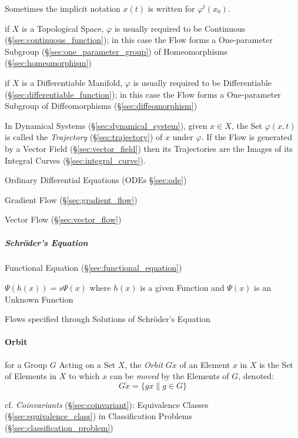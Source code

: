 Sometimes the implicit notation $x(t)$ is written for $\varphi^t(x_0)$.

if $X$ is a Topological Space, $\varphi$ is usually required to be Continuous
(\S\ref{sec:continuous_function}); in this case the Flow forms a One-parameter
Subgroup (\S\ref{sec:one_parameter_group}) of Homeomorphisms
(\S\ref{sec:homeomorphism})

if $X$ is a Differentiable Manifold, $\varphi$ is usually required to be
Differentiable (\S\ref{sec:differentiable_function}); in this case the Flow
forms a One-parameter Subgroup of Diffeomorphisms (\S\ref{sec:diffeomorphism})

In Dynamical Systems (\S\ref{sec:dynamical_system}), given $x \in X$, the Set
$\varphi(x,t)$ is called the \emph{Trajectory} (\S\ref{sec:trajectory}) of $x$
under $\varphi$. If the Flow is generated by a Vector Field
(\S\ref{sec:vector_field}) then its Trajectories are the Images of its Integral
Curves (\S\ref{sec:integral_curve}).

\fist Ordinary Differential Equations (ODEs \S\ref{sec:ode})

\fist Gradient Flow (\S\ref{sec:gradient_flow})

\fist Vector Flow (\S\ref{sec:vector_flow})



\subparagraph{Schr\"oder's Equation}\label{sec:schroders_equation}\hfill

Functional Equation (\S\ref{sec:functional_equation})

$\Psi(h(x)) = s\Psi(x)$ where $h(x)$ is a given Function and $\Psi(x)$ is
an Unknown Function

Flows specified through Solutions of Schr\"oder's Equation




\paragraph{Orbit}\label{sec:orbit}\hfill

for a Group $G$ Acting on a Set $X$, the \emph{Orbit} $G \dot x$ of an Element
$x$ in $X$ is the Set of Elements in $X$ to which $x$ can be \emph{moved} by
the Elements of $G$, denoted:
\[
  G \dot x = \{ g \dot x \| g \in G \}
\]

cf. \emph{Coinvariants} (\S\ref{sec:coinvariant}): Equivalence Classes
(\S\ref{sec:equivalence_class}) in Classification Problems
(\S\ref{sec:classification_problem})

